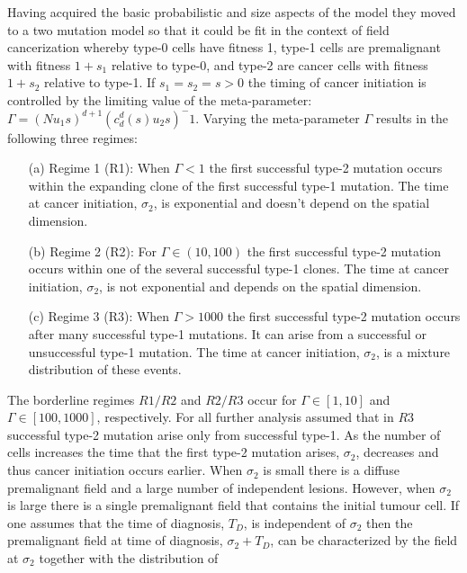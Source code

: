 \documentclass[\main/thesis.tex]{subfiles}
\begin{document}
Having acquired the basic probabilistic and size aspects of the model they moved 
to a two mutation model so that it could be fit in the context of field 
cancerization whereby type-0 cells have fitness 1, type-1 cells are premalignant 
with fitness $1 {+} s_1$ relative to type-0, and type-2 are cancer cells with 
fitness $1 {+} s_2$ relative to type-1. If $s_1{=}s_2{=}s > 0$ the timing of 
cancer initiation is controlled by the limiting value of the meta-parameter: 
$\Gamma {=} (Nu_1s)^{d{+}1}(c_d^d(s)u_2s)^-1$. Varying the meta-parameter 
$\Gamma$ results in the following three regimes:
\begin{itemize}
  \item[(a)] Regime 1 (R1): When $\Gamma {<} 1$ the first successful type-2 
             mutation occurs within the expanding clone of the first successful 
             type-1 mutation. The time at cancer initiation, $\sigma_2$, is 
             exponential and doesn't depend on the spatial dimension.
  \item[(b)] Regime 2 (R2): For $\Gamma {\in} (10, 100)$ the first successful 
             type-2 mutation occurs within one of the several successful type-1 
             clones. The time at cancer initiation, $\sigma_2$, is not 
             exponential and depends on the spatial dimension.
  \item[(c)] Regime 3 (R3): When $\Gamma {>} 1000$ the first successful type-2 
             mutation occurs after many successful type-1 mutations. It can 
             arise from a successful or unsuccessful type-1 mutation. The time 
             at cancer initiation, $\sigma_2$, is a mixture distribution of 
             these events.
\end{itemize}
The borderline regimes $R1/R2$ and $R2/R3$ occur for $\Gamma {\in} [1, 10]$ 
and $\Gamma {\in} [100, 1000]$, respectively. For all further analysis 
\textcite{Foo} assumed that in $R3$ successful type-2 mutation arise only from 
successful type-1. As the number of cells increases the time that the first 
type-2 mutation arises, $\sigma_2$, decreases and thus cancer initiation occurs 
earlier. When $\sigma_2$ is small there is a diffuse premalignant field and a 
large number of independent lesions. However, when $\sigma_2$ is large there is a 
single premalignant field that contains the initial tumour cell. If one assumes 
that the time of diagnosis, $T_D$, is independent of $\sigma_2$ then the 
premalignant field at time of diagnosis, $\sigma_2 {+} T_D$, can be 
characterized by the field at $\sigma_2$ together with the distribution of 
\end{document}

